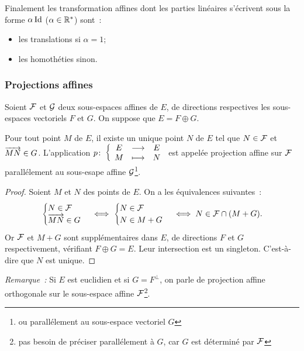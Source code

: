 Finalement les transformation affines dont les parties linéaires s'écrivent sous la forme $\alpha \operatorname{Id}$ ($\alpha \in \mathbb{R}^*$) sont~:
\begin{itemize}
\item les translations si $\alpha=1$;
\item les homothéties sinon.
\end{itemize}

\subsubsection{Projections affines}

Soient $\mathcal{F}$ et $\mathcal{G}$ deux sous-espaces affines de $E$, de directions respectives les sous-espaces vectoriels $F$ et $G$. On suppose que $E=F \oplus G$.

\begin{prop}
  Pour tout point $M$ de $E$, il existe un unique point $N$ de $E$ tel que $N \in \mathcal{F}$ et $\overrightarrow{MN} \in G$. L'application $p\colon \left\{\begin{array}{ccc} E & \longrightarrow &E\\ M & \longmapsto & N \end{array} \right.$ est appelée projection affine sur $\mathcal{F}$ parallélement au sous-esape affine $\mathcal{G}$\footnote{ou parallélement au sous-espace vectoriel $G$}.
\end{prop}
\begin{proof}
  Soient $M$ et $N$ des points de $E$. On a les équivalences suivantes~:
  \begin{equation}
    \begin{cases}
      N \in \mathcal{F} \\ \overrightarrow{MN} \in G
    \end{cases} 
    \iff
    \begin{cases}
      N \in \mathcal{F} \\ N \in M+G
    \end{cases}
    \iff N \in \mathcal{F} \cap (M+G).
  \end{equation}
  Or $\mathcal{F}$ et $M+G$ sont supplémentaires dans $E$, de directions $F$ et $G$ respectivement, vérifiant $F \oplus G =E$. Leur intersection est un singleton. C'est-à-dire que $N$ est unique.
\end{proof}

\emph{Remarque~:} Si $E$ est euclidien et si $G=F^\perp$, on parle de projection affine orthogonale sur le sous-espace affine $\mathcal{F}$\footnote{pas besoin de préciser parallélement à $G$, car $G$ est déterminé par $\mathcal{F}$}.

